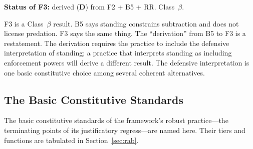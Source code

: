 \documentclass[11pt]{article}
\newcommand{\statusD}{\textcolor{stD}{\textbf{D}}}
\newcommand{\cb}{\texorpdfstring{Class~$\beta$}{Class beta}}
\begin{document}
\textbf{Status of F3:} derived (\statusD{}) from F2 + B5 + RR. \cb{}.

F3 is a \cb{} result. B5 says standing constrains subtraction and does not license predation. F3 says the same thing. The ``derivation'' from B5 to F3 is a restatement. The derivation requires the practice to include the defensive interpretation of standing; a practice that interprets standing as including enforcement powers will derive a different result. The defensive interpretation is one basic constitutive choice among several coherent alternatives.

\subsection{The Basic Constitutive Standards}
The basic constitutive standards of the framework's robust practice---the terminating points of its justificatory regress---are named here. Their tiers and functions are tabulated in Section~\ref{sec:rab}.
\end{document}
